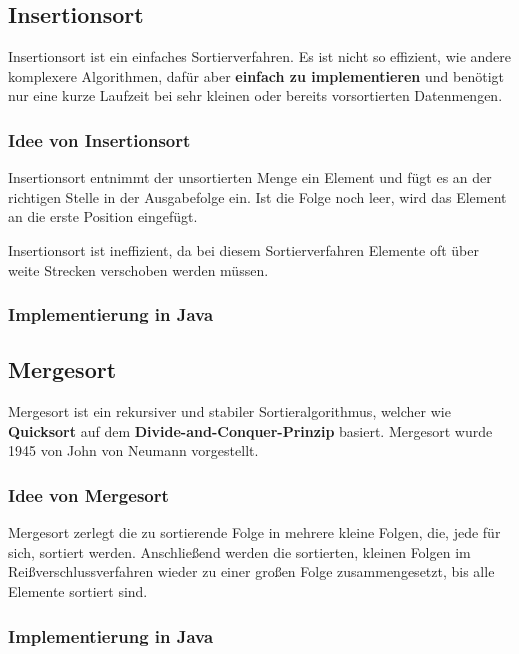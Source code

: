\documentclass[11pt, a4paper, titlepage, oneside]{article}
\renewcommand{\emph}{\textbf}
\begin{document}
	\subsection{Insertionsort}
	
	Insertionsort ist ein einfaches Sortierverfahren. Es ist nicht so effizient, wie andere komplexere Algorithmen, dafür aber \emph{einfach zu implementieren} und benötigt nur eine kurze Laufzeit bei sehr kleinen oder bereits vorsortierten Datenmengen.
	
	\subsubsection{Idee von Insertionsort}
	
	Insertionsort entnimmt der unsortierten Menge ein Element und fügt es an der richtigen Stelle in der Ausgabefolge ein. Ist die Folge noch leer, wird das Element an die erste Position eingefügt.
	
	Insertionsort ist ineffizient, da bei diesem Sortierverfahren Elemente oft über weite Strecken verschoben werden müssen.
	
	\subsubsection{Implementierung in Java}
	
	
	
	\subsection{Mergesort}
	
	Mergesort ist ein rekursiver und stabiler Sortieralgorithmus, welcher wie \emph{Quicksort} auf dem \emph{Divide-and-Conquer-Prinzip} basiert. Mergesort wurde 1945 von John von Neumann vorgestellt.
	
	\subsubsection{Idee von Mergesort}
	
	Mergesort zerlegt die zu sortierende Folge in mehrere kleine Folgen, die, jede für sich, sortiert werden. Anschließend werden die sortierten, kleinen Folgen im Reißverschlussverfahren wieder zu einer großen Folge zusammengesetzt, bis alle Elemente sortiert sind.
	
	\subsubsection{Implementierung in Java}
	
\end{document}
